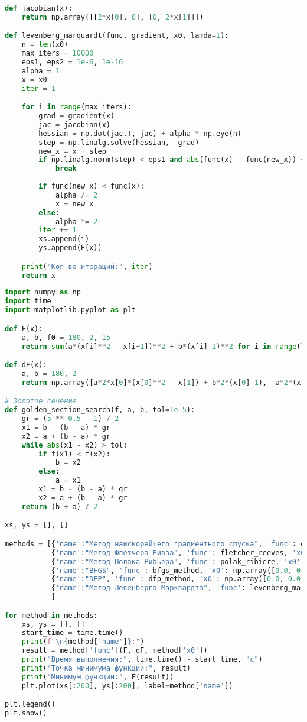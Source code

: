 \documentclass[a4paper, 14pt]{extarticle}
\begin{document}
\begin{lstlisting}[language=Python,caption={Метод Левенберга-Марквардта},label={lst:code4}]
def jacobian(x):
    return np.array([[2*x[0], 0], [0, 2*x[1]]])

def levenberg_marquardt(func, gradient, x0, lamda=1):
    n = len(x0)
    max_iters = 10000
    eps1, eps2 = 1e-6, 1e-16
    alpha = 1
    x = x0
    iter = 1

    for i in range(max_iters):
        grad = gradient(x)
        jac = jacobian(x)
        hessian = np.dot(jac.T, jac) + alpha * np.eye(n)
        step = np.linalg.solve(hessian, -grad)
        new_x = x + step
        if np.linalg.norm(step) < eps1 and abs(func(x) - func(new_x)) < eps2:
            break
        
        if func(new_x) < func(x):
            alpha /= 2
            x = new_x
        else:
            alpha *= 2
        iter += 1
        xs.append(i)
        ys.append(F(x))

    print("Кол-во итераций:", iter)
    return x
\end{lstlisting}

\begin{lstlisting}[language=Python,caption={Программа},label={lst:code5}]
import numpy as np
import time
import matplotlib.pyplot as plt

def F(x):
    a, b, f0 = 180, 2, 15
    return sum(a*(x[i]**2 - x[i+1])**2 + b*(x[i]-1)**2 for i in range(len(x)-1)) + f0

def dF(x):
    a, b = 180, 2
    return np.array([a*2*x[0]*(x[0]**2 - x[1]) + b*2*(x[0]-1), -a*2*(x[0]**2 - x[1])])

# Золотое сечение
def golden_section_search(f, a, b, tol=1e-5):
    gr = (5 ** 0.5 - 1) / 2
    x1 = b - (b - a) * gr
    x2 = a + (b - a) * gr
    while abs(x1 - x2) > tol:
        if f(x1) < f(x2):
            b = x2
        else:
            a = x1
        x1 = b - (b - a) * gr
        x2 = a + (b - a) * gr
    return (b + a) / 2

xs, ys = [], []

methods = [{'name':"Метод наискорейшего градиентного спуска", 'func': gradient_descent, 'x0': np.array([0.0, 0.0])}, 
           {'name':"Метод Флетчера-Ривза", 'func': fletcher_reeves, 'x0': np.array([2.0, 0.0])},
           {'name':"Метод Полака-Рибьера", 'func': polak_ribiere, 'x0': np.array([2.0, 0.0])},
           {'name':"BFGS", 'func': bfgs_method, 'x0': np.array([0.0, 0.0])}, 
           {'name':"DFP", 'func': dfp_method, 'x0': np.array([0.0, 0.0])},
           {'name':"Метод Левенберга-Марквардта", 'func': levenberg_marquardt, 'x0': np.array([0.0, 0.0])}
           ]

for method in methods:
    xs, ys = [], []
    start_time = time.time()
    print(f"\n{method['name']}:")
    result = method['func'](F, dF, method['x0'])
    print("Время выполнения:", time.time() - start_time, "c")
    print("Точка минимума функции:", result)
    print("Минимум функции:", F(result))
    plt.plot(xs[:200], ys[:200], label=method['name'])

plt.legend()
plt.show()
\end{lstlisting}
\end{document}
